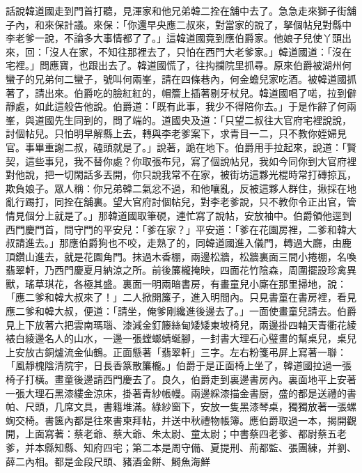 \begin{showcontents}{}
話說韓道國走到門首打聽，見渾家和他兄弟韓二拴在舖中去了。急急走來獅子街舖子內，和來保計議。來保：「你還早央應二叔來，對當家的說了，拏個帖兒對縣中李老爹一說，不論多大事情都了了。」這韓道國竟到應伯爵家。他娘子兒使丫頭出來，回：「沒人在家，不知往那裡去了，只怕在西門大老爹家。」韓道國道：「沒在宅裡。」問應寶，也跟出去了。韓道國慌了，往抅攔院里抓尋。原來伯爵被湖州何蠻子的兄弟何二蠻子，號叫何兩峯，請在四條巷內，何金蟾兒家吃酒。被韓道國抓著了，請出來。伯爵吃的臉紅紅的，帽簷上插著剔牙杖兒。韓道國唱了喏，拉到僻靜處，如此這般告他說。伯爵道：「既有此事，我少不得陪你去。」于是作辭了何兩峯，與道國先生同到的，問了端的。道國央及道：「只望二叔往大官府宅裡說說，討個帖兒。只怕明早解縣上去，轉與李老爹案下，求青目一二，只不教你姪婦見官。事畢重謝二叔，磕頭就是了。」說著，跪在地下。伯爵用手拉起來，說道：「賢契，這些事兒，我不替你處？你取張布兒，寫了個說帖兒，我如今同你到大官府裡對他說，把一切閑話多丟開，你只說我常不在家，被街坊這夥光棍時常打磚掠瓦，欺負娘子。眾人稱：你兄弟韓二氣忿不過，和他嚷亂，反被這夥人群住，揪採在地亂行踢打，同拴在舖裏。望大官府討個帖兒，對李老爹說，只不教你令正出官，管情見個分上就是了。」那韓道國取筆硯，連忙寫了說帖，安放袖中。伯爵領他逕到西門慶門首，問守門的平安兒：「爹在家？」平安道：「爹在花園房裡，二爹和韓大叔請進去。」那應伯爵狗也不咬，走熟了的，同韓道國進入儀門，轉過大廳，由鹿頂鑽山進去，就是花園角門。抹過木香棚，兩邊松牆，松牆裏面三間小捲棚，名喚翡翠軒，乃西門慶夏月納涼之所。前後簾櫳掩映，四面花竹陰森，周圍擺設珍禽異獸，瑤草琪花，各極其盛。裏面一明兩暗書房，有畫童兒小廝在那里掃地，說：「應二爹和韓大叔來了！」二人掀開簾子，進入明間內。只見書童在書房裡，看見應二爹和韓大叔，便道：「請坐，俺爹剛纔進後邊去了。」一面使畫童兒請去。伯爵見上下放著六把雲南瑪瑙、漆減金釘籐絲甸矮矮東坡椅兒，兩邊掛四軸天青衢花綾裱白綾邊名人的山水，一邊一張螳螂蜻蜒腳，一封書大理石心璧畫的幫桌兒，桌兒上安放古銅爐流金仙鶴。正面懸著「翡翠軒」三字。左右粉箋弔屏上寫著一聯：「風靜槐陰清院宇，日長香篆散簾櫳。」伯爵于是正面椅上坐了，韓道國拉過一張椅子打橫。畫童後邊請西門慶去了。良久，伯爵走到裏邊書房內。裏面地平上安著一張大理石黑漆縷金涼床，掛著青紗帳幔。兩邊綵漆描金書厨，盛的都是送禮的書帕、尺頭，几席文具，書籍堆滿。綠紗窗下，安放一隻黑漆琴桌，獨獨放著一張螺蜔交椅。書篋內都是往來書柬拜帖，并送中秋禮物帳簿。應伯爵取過一本，揭開觀開，上面寫著：蔡老爺、蔡大爺、朱太尉、童太尉；中書蔡四老爹、都尉蔡五老爹，并本縣知縣、知府四宅；第二本是周守備、夏提刑、荊都監、張團練，并劉、薛二內相。都是金段尺頭、豬酒金餅、鰣魚海鮮 
\end{showcontents}
